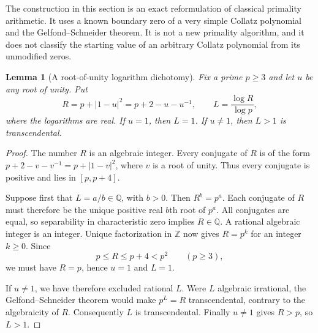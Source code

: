 \documentclass[11pt,a4paper]{article}
\newtheorem{lemma}[theorem]{Lemma}
\theoremstyle{definition}
\theoremstyle{remark}
\numberwithin{equation}{section}
\begin{document}
The construction in this section is an exact reformulation of classical
primality arithmetic. It uses a known boundary zero of a very simple
Collatz polynomial and the Gelfond--Schneider theorem. It is not a new
primality algorithm, and it does not classify the starting value of an
arbitrary Collatz polynomial from its unmodified zeros.

\begin{lemma}[A root-of-unity logarithm dichotomy]
\label{C:lem:fold-log-dichotomy}
Fix a prime $p\ge3$ and let $u$ be any root of unity. Put
\[
 R=p+|1-u|^2=p+2-u-u^{-1},\qquad
 L=\frac{\log R}{\log p},
\]
where the logarithms are real. If $u=1$, then $L=1$. If $u\ne1$, then
$L>1$ is transcendental.
\end{lemma}
\begin{proof}
The number $R$ is an algebraic integer. Every conjugate of $R$ is of
the form $p+2-v-v^{-1}=p+|1-v|^2$, where $v$ is a root of unity.
Thus every conjugate is positive and lies in $[p,p+4]$.

Suppose first that $L=a/b\in\mathbb Q$, with $b>0$. Then $R^b=p^a$.
Each conjugate of $R$ must therefore be the unique positive real
$b$th root of $p^a$. All conjugates are equal, so separability in
characteristic zero implies $R\in\mathbb Q$. A rational algebraic
integer is an integer. Unique factorization in $\mathbb Z$ now gives
$R=p^k$ for an integer $k\ge0$. Since
\[
 p\le R\le p+4<p^2\qquad(p\ge3),
\]
we must have $R=p$, hence $u=1$ and $L=1$.

If $u\ne1$, we have therefore excluded rational $L$. Were $L$
algebraic irrational, the Gelfond--Schneider theorem would make
$p^L=R$ transcendental, contrary to the algebraicity of $R$.
Consequently $L$ is transcendental. Finally $u\ne1$ gives $R>p$,
so $L>1$.
\end{proof}
\end{document}

